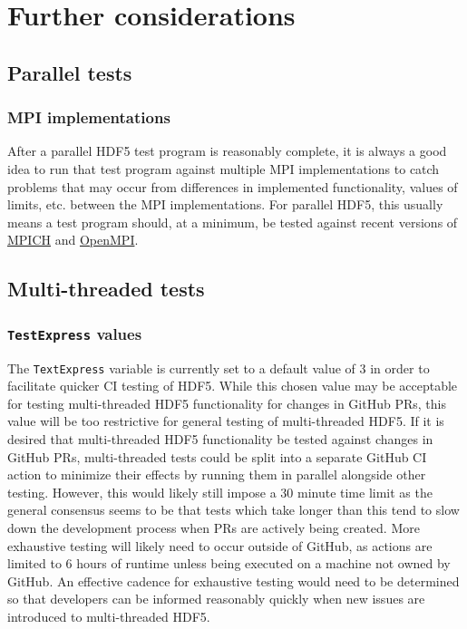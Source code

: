 \documentclass[../HDF5_RFC.tex]{subfiles}
\begin{document}
\section{Further considerations}
\label{further_considerations}

\subsection{Parallel tests}

\subsubsection{MPI implementations}

After a parallel HDF5 test program is reasonably complete, it is always a good idea to run that test
program against multiple MPI implementations to catch problems that may occur from differences in
implemented functionality, values of limits, etc. between the MPI implementations. For parallel HDF5,
this usually means a test program should, at a minimum, be tested against recent versions of
\href{https://www.mpich.org/}{MPICH} and \href{https://www.open-mpi.org/}{OpenMPI}.

\subsection{Multi-threaded tests}

\subsubsection{\texttt{TestExpress} values}

The \texttt{TextExpress} variable is currently set to a default value of 3 in order to facilitate quicker
CI testing of HDF5. While this chosen value may be acceptable for testing multi-threaded HDF5 functionality
for changes in GitHub PRs, this value will be too restrictive for general testing of multi-threaded HDF5.
If it is desired that multi-threaded HDF5 functionality be tested against changes in GitHub PRs,
multi-threaded tests could be split into a separate GitHub CI action to minimize their effects by running
them in parallel alongside other testing. However, this would likely still impose a 30 minute time limit
as the general consensus seems to be that tests which take longer than this tend to slow down the development
process when PRs are actively being created. More exhaustive testing will likely need to occur outside of
GitHub, as actions are limited to 6 hours of runtime unless being executed on a machine not owned by GitHub.
An effective cadence for exhaustive testing would need to be determined so that developers can be informed
reasonably quickly when new issues are introduced to multi-threaded HDF5.
\end{document}
